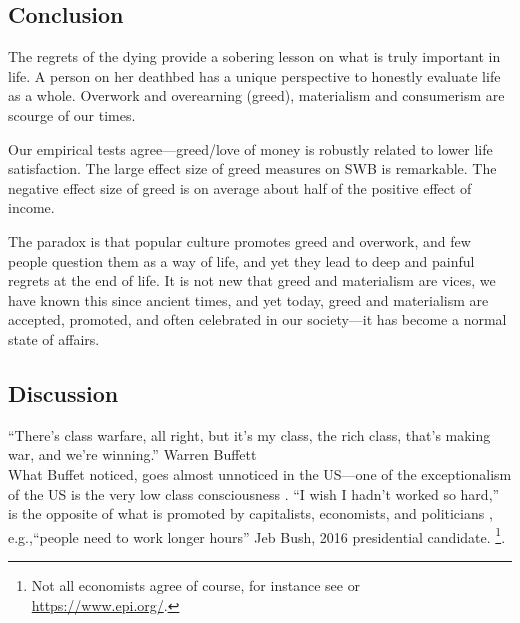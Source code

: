 \documentclass[10pt, letterpaper]{article}
\begin{document}
\begin{spacing}{1.8}
\subsection{Conclusion}

The regrets of the dying \citep{ware12} provide a sobering lesson on what is
truly important in life. A person on her deathbed has a unique perspective to
honestly evaluate life as a whole. Overwork and overearning (greed), materialism and consumerism are scourge of our times.

Our empirical tests agree---greed/love of money is
robustly related to lower life satisfaction. The large effect size of greed measures on SWB is remarkable. The negative effect size of greed is on average about half of the positive effect of income.

The paradox is that popular culture promotes greed and overwork, and few people question them as a way of life, and yet they lead to deep and painful regrets at the end of life.
%
 It is not new that greed and materialism are vices, we have known this since ancient times, and yet today, greed and materialism are accepted, promoted, and often celebrated in our society---it has become a normal state of affairs. 
 

\subsection{Discussion}

``There's class warfare, all right, but it's my class, the rich class, that's making war, and we're winning.'' Warren Buffett\\

What Buffet noticed, goes almost unnoticed in the US---one of the exceptionalism of the US is the very low class consciousness \citep{lipset97, lipset00}.
%
%
``I wish I hadn't worked so hard,''  is the opposite of  what is promoted by capitalists, economists, and politicians \cite{wang11b,wight2005adam}, e.g.,``people need to work longer hours'' Jeb Bush, 2016 presidential candidate\citep{smithABC15jul8}. \footnote{Not all economists agree of course,
  for instance see \citet{wight2005adam} or \url{https://www.epi.org/}.}.
 



\end{spacing}
\end{document}
